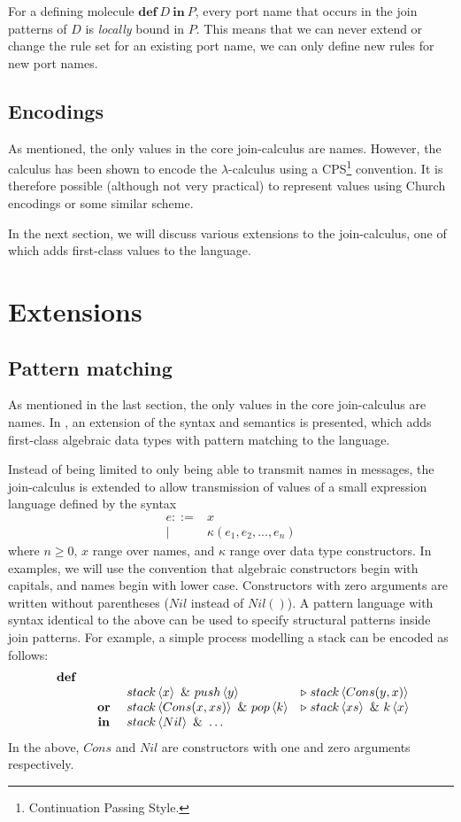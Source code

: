 For a defining molecule $\mathbf{def}~D~\mathbf{in}~P$, every port name that
occurs in the join patterns of $D$ is \emph{locally} bound in $P$. This means
that we can never extend or change the rule set for an existing port name, we
can only define new rules for new port names.

\subsection{Encodings}

As mentioned, the only values in the core join-calculus are names. However, the
calculus has been shown to encode the $\lambda$-calculus using a
CPS\footnote{Continuation Passing Style.} convention\cite{fournet1996reflexive}. It is
therefore possible (although not very practical) to represent values using
Church encodings or some similar scheme.

In the next section, we will discuss various extensions to the join-calculus,
one of which adds first-class values to the language.


\section{Extensions}

\subsection{Pattern matching}
As mentioned in the last section, the only values in the core join-calculus are
names. In \cite{MaMa2008AlgPat}, an extension of the syntax and semantics is
presented, which adds first-class algebraic data types with pattern matching to
the language.

Instead of being limited to only being able to transmit names in messages, the
join-calculus is extended to allow transmission of values of a small expression
language defined by the syntax
\begin{align*}
 e ::={}& x \\
  |\quad{}& \kappa(e_1, e_2, ..., e_n)
\end{align*}
where $n \geq 0$, $x$ range over names, and $\kappa$ range over data type
constructors. In examples, we will use the convention that algebraic
constructors begin with capitals, and names begin with lower case. Constructors
with zero arguments are written without parentheses ($Nil$ instead of $Nil()$).
A pattern language with syntax identical to the above can be used to specify
structural patterns inside join patterns. For example, a simple process
modelling a stack can be encoded as follows:
\begin{displaymath}
\begin{array}{rcll}
\defJ &&&
\\ & &   \atm stack<x> \andJ \atm push<y> &\toJ{} \atm stack<Cons(y,x)>
\\&\orJ&  \atm stack<Cons(x, xs)> \andJ \atm pop<k>& \toJ{} \atm stack<xs> \andJ \atm k<x>
\\&\inJ& \atm stack<Nil> \andJ \ldots
\end{array}
\end{displaymath}
In the above, $Cons$ and $Nil$ are constructors with one and zero arguments
respectively.

